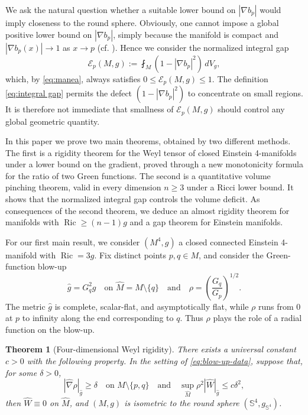 \documentclass[11pt]{amsart}
\theoremstyle{plain}
\newtheorem{theorem}{Theorem}[section]
\numberwithin{equation}{section}
\renewcommand{\S}{\mathbb{S}}
\newcommand{\E}{\mathcal{E}}
\DeclareMathOperator{\ric}{Ric}
\newcommand{\hn}{\widehat{\nabla}}
\newcommand{\hg}{\widehat{g}}
\newcommand{\hw}{\widehat{W}}
\newcommand{\hm}{\widehat{M}}
\begin{document}
We ask the natural question whether a suitable lower bound on $|\nabla b_p|$ would imply closeness to the round sphere. Obviously, one cannot impose a global positive lower bound on $|\nabla b_p|$, simply because the manifold is compact and $|\nabla b_p(x)| \to 1$ as $x \to p$ (cf. \cite[Lemma 2.4]{Man25}). Hence we consider the normalized integral gap
\begin{equation}\label{eq:integral gap}
\E_p(M,g):=\fint_M(1-|\nabla b_p|^2)\,dV_g,
\end{equation}
which, by \eqref{eq:manea}, always satisfies $0\le\E_p(M,g)\le 1$. The definition \eqref{eq:integral gap} permits the defect $(1-|\nabla b_p|^2)$ to concentrate on small regions. It is therefore not immediate that smallness of $\E_p(M,g)$ should control any global geometric quantity.

In this paper we prove two main theorems, obtained by two different methods. The first is a rigidity theorem for the Weyl tensor of closed Einstein 4-manifolds under a lower bound on the gradient, proved through a new monotonicity formula for the ratio of two Green functions. The second is a quantitative volume pinching theorem, valid in every dimension $n\ge 3$ under a Ricci lower bound. It shows that the normalized integral gap controls the volume deficit. As consequences of the second theorem, we deduce an almost rigidity theorem for manifolds with $\ric\ge(n-1)g$ and a gap theorem for Einstein manifolds.

For our first main result, we consider $(M^4,g)$ a closed connected Einstein 4-manifold with $\ric=3g$. Fix distinct points $p,q\in M$, and consider the Green-function blow-up 
\begin{equation}\label{eq:blow-up-data}
\hg=G_q^2g\quad\text{on $\hm=M\setminus\{q\}$}\quad\text{and}\quad \rho=\left(\frac{G_q}{G_p}\right)^{1/2}.
\end{equation}
The metric $\hg$ is complete, scalar-flat, and asymptotically flat, while $\rho$ runs from $0$ at $p$ to infinity along the end corresponding to $q$. Thus $\rho$ plays the role of a radial function on the blow-up.

\begin{theorem}[Four-dimensional Weyl rigidity]\label{thm1}
There exists a universal constant $c>0$ with the following property. In the setting of \eqref{eq:blow-up-data}, suppose that, for some $\delta>0$, 
\begin{equation*}
|\hn\rho|_{\hg}\ge\delta\quad\text{on $M\setminus\{p,q\}$}\quad \text{and}\quad \sup_{\hm}\rho^2|\hw|_{\hg}\le c\delta^2,
\end{equation*}
then $\hw\equiv 0$ on $\hm$, and $(M,g)$ is isometric to the round sphere $(\S^4,g_{\S^4})$.
\end{theorem}
\end{document}
